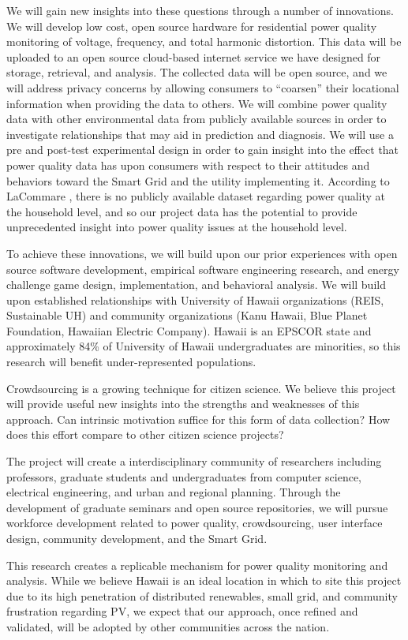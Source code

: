 We will gain new insights into these questions through a number of innovations.  We will develop low cost, open source hardware for residential power quality monitoring of voltage, frequency, and total harmonic distortion. This data will be uploaded to an open source cloud-based internet service we have designed for storage, retrieval, and analysis. The collected data will be open source, and we will address privacy concerns by allowing consumers to ``coarsen'' their locational information when providing the data to others.  We will combine power quality data with other environmental data from publicly available sources in order to investigate relationships that may aid in prediction and diagnosis.  We will use a pre and post-test experimental design in order to gain insight into the effect that power quality data has upon consumers with respect to their attitudes and behaviors toward the Smart Grid and the utility implementing it.  According to LaCommare \cite{LaCommare2004}, there is no publicly available dataset regarding power quality at the household level, and so our project data has the potential to provide unprecedented insight into power quality issues at the household level.

To achieve these innovations, we will build upon our prior experiences with open source software development, empirical software engineering research, and energy challenge game design, implementation, and behavioral analysis. We will build upon established relationships with University of Hawaii organizations (REIS, Sustainable UH) and community organizations (Kanu Hawaii, Blue Planet Foundation, Hawaiian Electric Company).  Hawaii is an EPSCOR state and approximately 84\% of University of Hawaii undergraduates are minorities, so this research will benefit under-represented populations.

Crowdsourcing is a growing technique for citizen science. We believe this project will provide useful new insights into the strengths and weaknesses of this approach. Can intrinsic motivation suffice for this form of data collection? How does this effort compare to other citizen science projects? 

The project will create a interdisciplinary community of researchers including professors, graduate students and undergraduates from computer science, electrical engineering, and urban and regional planning.  Through the development of graduate seminars and open source repositories, we will pursue workforce development related to power quality, crowdsourcing, user interface design, community development, and the Smart Grid.

This research creates a replicable mechanism for power quality monitoring and analysis. While we believe Hawaii is an ideal location in which to site this project due to its high penetration of distributed renewables, small grid, and community frustration regarding PV, we expect that our approach, once refined and validated, will be adopted by other communities across the nation. 




